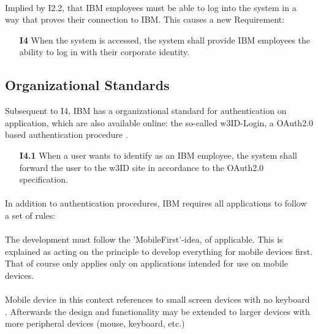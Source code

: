 \paragraph{} Implied by I2.2, that IBM employees must be able to log into the system in a way that proves their connection to IBM. This causes a new Requirement:

\begin{itemize}
    \item [\textbf{I4}] When the system is accessed, the system shall provide IBM employees the ability to log in with their corporate identity.
\end{itemize}

\subsection{Organizational Standards}
Subsequent to I4, IBM has a organizational standard for authentication on application, which are also available online: the so-called w3ID-Login, a OAuth2.0 \parencite[cf.][]{InternetEngineeringTaskForce.2012} based authentication procedure \parencite[cf.][]{IBMCorporation.2016}.

\begin{itemize}
    \item [\textbf{I4.1}] When a user wants to identify as an IBM employee, the system shall forward the user to the w3ID site in accordance to the OAuth2.0 specification.
\end{itemize}

\paragraph{} In addition to authentication procedures, IBM requires all applications to follow a set of rules:

\paragraph{} The development must follow the 'MobileFirst'-idea, of applicable. This is explained as acting on the principle to develop everything for mobile devices first. That of course only applies only on applications intended for use on mobile devices.

\paragraph{} Mobile device in this context references to small screen devices with no keyboard \parencite[cf.][]{Duong.2014}. Afterwards the design and functionality may be extended to larger devices with more peripheral devices (mouse, keyboard, etc.)

